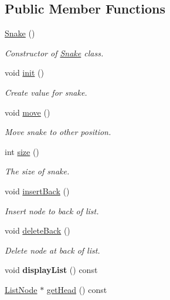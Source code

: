 \subsection*{Public Member Functions}
\begin{DoxyCompactItemize}
\item 
\hyperlink{class_snake_aa9cbcdb4b25d84cbf83509039cac8d01}{Snake} ()
\begin{DoxyCompactList}\small\item\em Constructor of \hyperlink{class_snake}{Snake} class. \end{DoxyCompactList}\item 
void \hyperlink{class_snake_ac9f00db4b693de3c552a0ae7275c8412}{init} ()
\begin{DoxyCompactList}\small\item\em Create value for snake. \end{DoxyCompactList}\item 
void \hyperlink{class_snake_a5aea260c328ba4f8701539eab08283d9}{move} ()
\begin{DoxyCompactList}\small\item\em Move snake to other position. \end{DoxyCompactList}\item 
int \hyperlink{class_snake_a9dd0a8a2a763668e12646385da8280e2}{size} ()
\begin{DoxyCompactList}\small\item\em The size of snake. \end{DoxyCompactList}\item 
void \hyperlink{class_snake_a2940bb3101863ab8a02a8a396c6552f2}{insert\+Back} ()
\begin{DoxyCompactList}\small\item\em Insert node to back of list. \end{DoxyCompactList}\item 
void \hyperlink{class_snake_aef36368de7f3f811d424e3ae02f2393d}{delete\+Back} ()
\begin{DoxyCompactList}\small\item\em Delete node at back of list. \end{DoxyCompactList}\item 
\mbox{\label{class_snake_a06a611ba3edd353051e4dcd59642ace0}} 
void {\bfseries display\+List} () const
\item 
\hyperlink{class_list_node}{List\+Node} $\ast$ \hyperlink{class_snake_a69f6fbdc2ef89a8d8881dbfdbca2260f}{get\+Head} () const

\end{DoxyCompactItemize}
